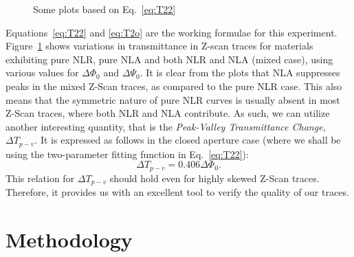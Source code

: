 \documentclass[%
 reprint,
amsmath,
amssymb,
10pt
]{revtex4-2}
\begin{document}
\begin{figure}
\caption{Some plots based on Eq.~\ref{eq:T22} \cite{calc}}
\label{fig:Tvar}
\end{figure}

Equations~\ref{eq:T22} and \ref{eq:T2o} are the working formulae for this experiment. Figure~\ref{fig:Tvar} shows variations in transmittance in Z-scan traces for materials exhibiting pure NLR, pure NLA and both NLR and NLA (mixed case), using various values for $\Delta\Phi_0$ and $\Delta\Psi_0$. It is clear from the plots that NLA suppresses peaks in the mixed Z-Scan traces, as compared to the pure NLR case. This also means that the symmetric nature of pure NLR curves is usually absent in most Z-Scan traces, where both NLR and NLA contribute. As such, we can utilize another interesting quantity, that is the \textit{Peak-Valley Transmittance Change}, $\Delta T_{p-v}$. It is expressed as follows in the closed aperture case (where we shall be using the two-parameter fitting function in Eq.~\ref{eq:T22}):
\begin{equation}
    \boxed{
        \Delta T_{p-v} = 0.406\Delta\Phi_0
    }.
    \label{eq:Tpv}
\end{equation}
This relation for $\Delta T_{p-v}$ should hold even for highly skewed Z-Scan traces. Therefore, it provides us with an excellent tool to verify the quality of our traces.

\section{\label{meth}Methodology}
\end{document}
